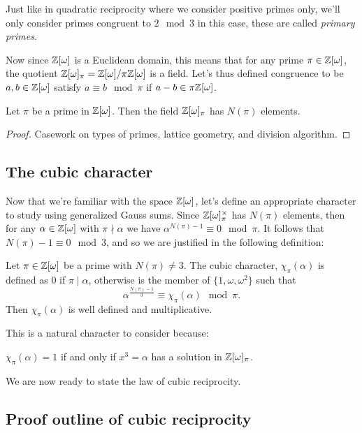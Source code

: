 \documentclass[utf8, letterpaper]{article}
\begin{document}
Just like in quadratic reciprocity where we consider positive primes only, we'll only consider primes congruent to $2\mod 3$ in this case, these are called \emph{primary primes}.

Now since $\mathbb{Z}[\omega]$ is a Euclidean domain, this means that for any prime $\pi\in \mathbb{Z}[\omega]$, the quotient $\mathbb{Z}[\omega]_\pi = \mathbb{Z}[\omega] /\pi \mathbb{Z}[\omega]$ is a field. Let's thus defined congruence to be $a,b\in \mathbb{Z}[\omega]$ satisfy $a\equiv b\mod \pi$ if $a-b\in \pi\mathbb{Z}[\omega]$.

\begin{proposition}
    Let $\pi$ be a prime in $\mathbb{Z}[\omega]$. Then the field $\mathbb{Z}[\omega]_\pi$ has $N(\pi)$ elements.
\end{proposition}

\begin{proof}
    Casework on types of primes, lattice geometry, and division algorithm.
\end{proof}

\subsection{The cubic character}

Now that we're familiar with the space $\mathbb{Z}[\omega]$, let's define an appropriate character to study using generalized Gauss sums. Since $\mathbb{Z}[\omega]_\pi^\times$ has $N(\pi)$ elements, then for any $\alpha\in \mathbb{Z}[\omega]$ with $\pi\nmid \alpha$ we have $\alpha^{N(\pi)-1}\equiv 0\mod \pi$. It follows that $N(\pi)-1\equiv 0\mod 3$, and so we are justified in the following definition:

\begin{definition}
    Let $\pi\in \mathbb{Z}[\omega]$ be a prime with $N(\pi)\neq 3$. The cubic character, $\chi_\pi(\alpha)$ is defined as $0$ if $\pi\mid \alpha$, otherwise is the member of $\{1,\omega,\omega^2\}$ such that
    \[
        \alpha^{\frac{N(\pi)-1}{3}}\equiv \chi_\pi(\alpha)\mod \pi
    .\]   
    Then $\chi_\pi(\alpha)$ is well defined and multiplicative.
\end{definition}

This is a natural character to consider because:
\begin{proposition}
    $\chi_\pi(\alpha)=1$ if and only if $x^3=\alpha$ has a solution in $\mathbb{Z}[\omega]_\pi$.
\end{proposition}

We are now ready to state the law of cubic reciprocity.

\subsection{Proof outline of cubic reciprocity}
\end{document}
